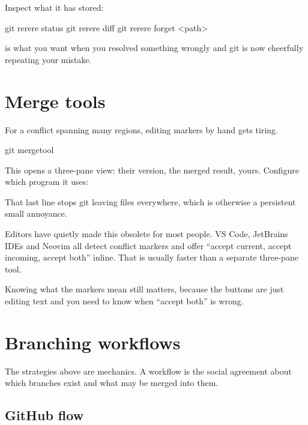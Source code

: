 \documentclass[11pt]{article}
\begin{document}
Inspect what it has stored:

\begin{shell}
git rerere status
git rerere diff
git rerere forget <path>
\end{shell}

 is what you want when you resolved something wrongly and git is now
cheerfully repeating your mistake.

\section{Merge tools}

For a conflict spanning many regions, editing markers by hand gets tiring.

\begin{shell}
git mergetool
\end{shell}

This opens a three-pane view: their version, the merged result, yours. Configure
which program it uses:


That last line stops git leaving  files everywhere, which is otherwise a
persistent small annoyance.

\begin{note}
Editors have quietly made this obsolete for most people. VS Code, JetBrains IDEs and
Neovim all detect conflict markers and offer ``accept current, accept incoming,
accept both'' inline. That is usually faster than a separate three-pane tool.

Knowing what the markers mean still matters, because the buttons are just editing
text and you need to know when ``accept both'' is wrong.
\end{note}

\section{Branching workflows}

The strategies above are mechanics. A workflow is the social agreement about which
branches exist and what may be merged into them.

\subsection{GitHub flow}
\end{document}
